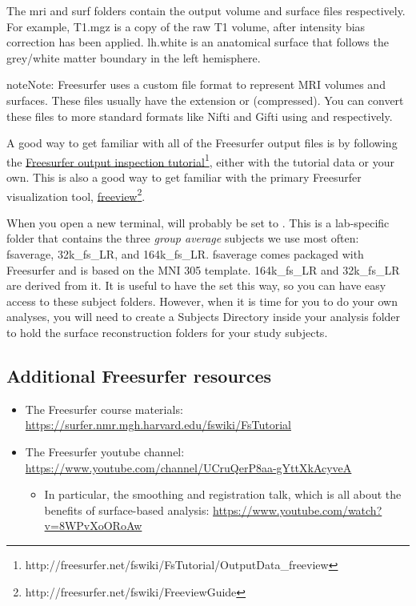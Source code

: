 \documentclass[letterpaper,10pt,openany,oneside]{sphinxmanual}
\begin{document}
The mri and surf folders contain the output volume and surface files
respectively. For example, T1.mgz is a copy of the raw T1 volume, after
intensity bias correction has been applied. lh.white is an anatomical
surface that follows the grey/white matter boundary in the left hemisphere.

\begin{notice}{note}{Note:}
Freesurfer uses a custom file format to represent MRI volumes and
surfaces. These files usually have the extension  or 
(compressed). You can convert these files to more standard formats
like Nifti and Gifti using  and 
respectively.
\end{notice}

A good way to get familiar with all of the Freesurfer output files is by
following the \href{http://freesurfer.net/fswiki/FsTutorial/OutputData\_freeview}{Freesurfer output inspection tutorial}\footnote{http://freesurfer.net/fswiki/FsTutorial/OutputData\_freeview}, either with the
tutorial data or your own. This is also a good way to get familiar with the
primary Freesurfer visualization tool, \href{http://freesurfer.net/fswiki/FreeviewGuide}{freeview}\footnote{http://freesurfer.net/fswiki/FreeviewGuide}.

When you open a new terminal,  will probably be set to
. This is a lab-specific folder that contains the
three \emph{group average} subjects we use most often: fsaverage, 32k\_fs\_LR, and
164k\_fs\_LR. fsaverage comes packaged with Freesurfer and is based on the MNI
305 template. 164k\_fs\_LR and 32k\_fs\_LR are derived from it. It is useful to
have the  set this way, so you can have easy access to these
subject folders. However, when it is time for you to do your own analyses, you
will need to create a Subjects Directory inside your analysis folder to hold
the surface reconstruction folders for your study subjects.


\subsection{Additional Freesurfer resources}
\label{surface_reconstruction:additional-freesurfer-resources}\begin{itemize}
\item {} 
The Freesurfer course materials: \href{https://surfer.nmr.mgh.harvard.edu/fswiki/FsTutorial}{https://surfer.nmr.mgh.harvard.edu/fswiki/FsTutorial}

\item {} 
The Freesurfer youtube channel: \href{https://www.youtube.com/channel/UCruQerP8aa-gYttXkAcyveA}{https://www.youtube.com/channel/UCruQerP8aa-gYttXkAcyveA}
\begin{itemize}
\item {} 
In particular, the smoothing and registration talk, which is all about the
benefits of surface-based analysis: \href{https://www.youtube.com/watch?v=8WPvXoORoAw}{https://www.youtube.com/watch?v=8WPvXoORoAw}

\end{itemize}

\end{itemize}
\end{document}
